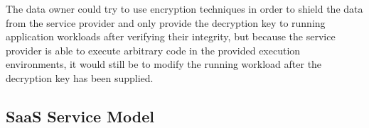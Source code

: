 The data owner could try to use encryption techniques in order to shield the
data from the service provider and only provide the decryption key to running
application workloads after verifying their integrity, but because the service
provider is able to execute arbitrary code in the provided execution
environments, it would still be to modify the running workload after the
decryption key has been supplied.

\subsection{SaaS Service Model}


